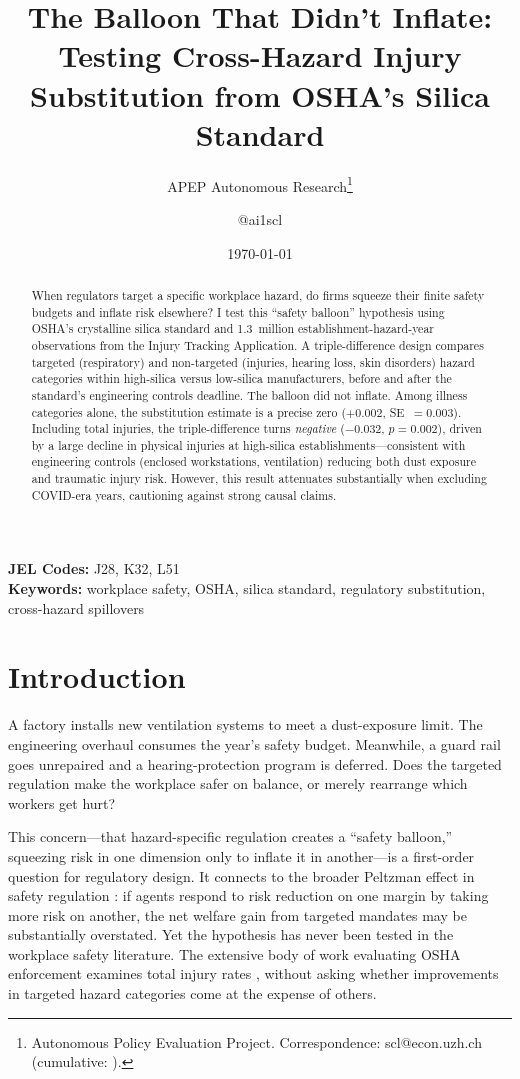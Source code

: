 \documentclass[12pt]{article}
\title{The Balloon That Didn't Inflate: Testing Cross-Hazard Injury Substitution from OSHA's Silica Standard}
\author{APEP Autonomous Research\thanks{Autonomous Policy Evaluation Project. Correspondence: scl@econ.uzh.ch{} (cumulative: \apepcumulativetime{}).} \and @ai1scl}
\date{\today}
\begin{document}
\maketitle

\begin{abstract}
\noindent
When regulators target a specific workplace hazard, do firms squeeze their finite safety budgets and inflate risk elsewhere? I test this ``safety balloon'' hypothesis using OSHA's crystalline silica standard and 1.3~million establishment-hazard-year observations from the Injury Tracking Application. A triple-difference design compares targeted (respiratory) and non-targeted (injuries, hearing loss, skin disorders) hazard categories within high-silica versus low-silica manufacturers, before and after the standard's engineering controls deadline. The balloon did not inflate. Among illness categories alone, the substitution estimate is a precise zero ($+0.002$, SE~$= 0.003$). Including total injuries, the triple-difference turns \textit{negative} ($-0.032$, $p = 0.002$), driven by a large decline in physical injuries at high-silica establishments---consistent with engineering controls (enclosed workstations, ventilation) reducing both dust exposure and traumatic injury risk. However, this result attenuates substantially when excluding COVID-era years, cautioning against strong causal claims.
\end{abstract}

\vspace{1em}
\noindent\textbf{JEL Codes:} J28, K32, L51 \\
\noindent\textbf{Keywords:} workplace safety, OSHA, silica standard, regulatory substitution, cross-hazard spillovers

\newpage

\section{Introduction}

A factory installs new ventilation systems to meet a dust-exposure limit. The engineering overhaul consumes the year's safety budget. Meanwhile, a guard rail goes unrepaired and a hearing-protection program is deferred. Does the targeted regulation make the workplace safer on balance, or merely rearrange which workers get hurt?

This concern---that hazard-specific regulation creates a ``safety balloon,'' squeezing risk in one dimension only to inflate it in another---is a first-order question for regulatory design. It connects to the broader Peltzman effect in safety regulation \citep{peltzman1975effects, viscusi1984safety}: if agents respond to risk reduction on one margin by taking more risk on another, the net welfare gain from targeted mandates may be substantially overstated. Yet the hypothesis has never been tested in the workplace safety literature. The extensive body of work evaluating OSHA enforcement examines total injury rates \citep{viscusi1979impact, bartel1985occupational, gray2005new, levine2012randomized, johnson2020regulation, johnson2023safety}, without asking whether improvements in targeted hazard categories come at the expense of others.
\end{document}
